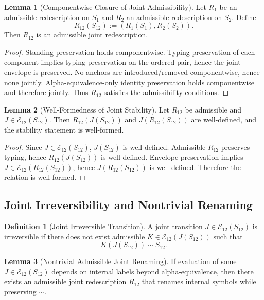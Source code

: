 \documentclass[11pt]{article}
\theoremstyle{definition}
\newtheorem{definition}{Definition}
\newtheorem{lemma}{Lemma}
\begin{document}
\begin{lemma}[Componentwise Closure of Joint Admissibility]
Let $R_1$ be an admissible redescription on $S_1$ and $R_2$ an admissible redescription on $S_2$.
Define
\[
R_{12}(S_{12}) := (R_1(S_1),R_2(S_2)).
\]
Then $R_{12}$ is an admissible joint redescription.
\end{lemma}

\begin{proof}
Standing preservation holds componentwise. Typing preservation of each component implies typing preservation on the ordered pair, hence
the joint envelope is preserved. No anchors are introduced/removed componentwise, hence none jointly. Alpha-equivalence-only identity
preservation holds componentwise and therefore jointly. Thus $R_{12}$ satisfies the admissibility conditions.
\end{proof}

\begin{lemma}[Well-Formedness of Joint Stability]
Let $R_{12}$ be admissible and $J\in\mathcal{E}_{12}(S_{12})$. Then $R_{12}(J(S_{12}))$ and $J(R_{12}(S_{12}))$ are well-defined,
and the stability statement is well-formed.
\end{lemma}

\begin{proof}
Since $J\in\mathcal{E}_{12}(S_{12})$, $J(S_{12})$ is well-defined. Admissible $R_{12}$ preserves typing, hence $R_{12}(J(S_{12}))$ is well-defined.
Envelope preservation implies $J\in\mathcal{E}_{12}(R_{12}(S_{12}))$, hence $J(R_{12}(S_{12}))$ is well-defined. Therefore the relation is well-formed.
\end{proof}

\subsection{Joint Irreversibility and Nontrivial Renaming}

\begin{definition}[Joint Irreversible Transition]
A joint transition $J\in\mathcal{E}_{12}(S_{12})$ is irreversible if there does not exist admissible
$K\in\mathcal{E}_{12}(J(S_{12}))$ such that
\[
K(J(S_{12}))\sim S_{12}.
\]
\end{definition}

\begin{lemma}[Nontrivial Admissible Joint Renaming]
If evaluation of some $J\in\mathcal{E}_{12}(S_{12})$ depends on internal labels beyond alpha-equivalence,
then there exists an admissible joint redescription $R_{12}$ that renames internal symbols while preserving $\sim$.
\end{lemma}
\end{document}
